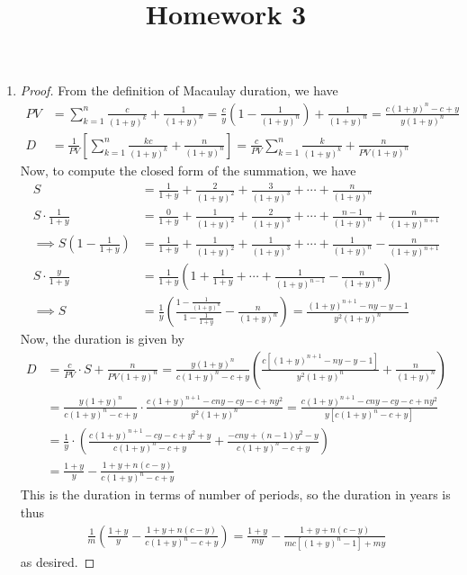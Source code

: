 \documentclass{article}
\begin{document}
\title{Homework 3}
\maketitle
\thispagestyle{fancy}

\begin{enumerate}[1.]
	\item 
		\begin{proof}
			From the definition of Macaulay duration, we have
			\begin{align*}
				PV &= \sum_{k=1}^{n} \frac{c}{\left( 1+y \right)^k} + \frac{1}{(1+y)^{n}} = \frac{c}{y}\left( 1- \frac{1}{(1+y)^n} \right) + \frac{1}{(1+y)^n} = \frac{c(1+y)^n-c+y}{y(1+y)^n} \\
				D &= \frac{1}{PV} \left[\sum_{k=1}^{n} \frac{kc}{\left( 1+y \right)^k} + \frac{n}{(1+y)^n}\right] = \frac{c}{PV}\sum_{k=1}^{n} \frac{k}{(1+y)^k} + \frac{n}{PV(1+y)^n}
			\end{align*}
			Now, to compute the closed form of the summation, we have
			\begin{align*}
				S &= \frac{1}{1+y} + \frac{2}{(1+y)^2} + \frac{3}{(1+y)^3} + \cdots + \frac{n}{(1+y)^n} \\
				S\cdot \frac{1}{1+y} &= \frac{0}{1+y} + \frac{1}{(1+y)^2} + \frac{2}{(1+y)^3} + \cdots + \frac{n-1}{(1+y)^n} + \frac{n}{(1+y)^{n+1}} \\
				\implies S\left( 1- \frac{1}{1+y} \right) &= \frac{1}{1+y} + \frac{1}{(1+y)^2} + \frac{1}{(1+y)^3} + \cdots + \frac{1}{(1+y)^n} - \frac{n}{(1+y)^{n+1}} \\
				S\cdot \frac{y}{1+y} &= \frac{1}{1+y}\left( 1+\frac{1}{1+y} + \cdots + \frac{1}{(1+y)^{n-1}} - \frac{n}{(1+y)^n} \right) \\
				\implies S &= \frac{1}{y} \left( \frac{1-\frac{1}{(1+y)^n}}{1-\frac{1}{1+y}} - \frac{n}{(1+y)^n} \right) = \frac{(1+y)^{n+1}-ny-y-1}{y^2(1+y)^n}
			\end{align*}
			Now, the duration is given by
			\begin{align*}
				D &= \frac{c}{PV}\cdot S + \frac{n}{PV(1+y)^n} = \frac{y(1+y)^n}{c(1+y)^n-c+y}\left(\frac{c\left[(1+y)^{n+1}-ny-y-1\right]}{y^2(1+y)^n} + \frac{n}{(1+y)^n}\right) \\
				&= \frac{y(1+y)^n}{c(1+y)^n-c+y}\cdot \frac{c(1+y)^{n+1}-cny-cy-c + ny^2}{y^2(1+y)^n} = \frac{c(1+y)^{n+1}-cny-cy-c+ny^2}{y\left[c(1+y)^n-c+y\right]} \\
				&= \frac{1}{y}\cdot \left(\frac{c(1+y)^{n+1}-cy-c+y^2+y}{c(1+y)^n-c+y} + \frac{-cny+(n-1)y^2-y}{c(1+y)^n-c+y} \right) \\
				&= \frac{1+y}{y} - \frac{1+y+n(c-y)}{c(1+y)^n-c+y}
			\end{align*}
			This is the duration in terms of number of periods, so the duration in years is thus
			\begin{align*}
				\frac{1}{m} \left( \frac{1+y}{y} - \frac{1+y+n(c-y)}{c(1+y)^n-c+y} \right) = \frac{1+y}{my} - \frac{1+y+n(c-y)}{mc\left[ (1+y)^n-1 \right]+my}
			\end{align*}
			as desired.
		\end{proof}


\end{enumerate}
\end{document}
